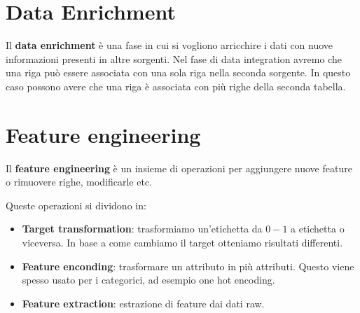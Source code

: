 \section{Data Enrichment}
Il \textbf{data enrichment} è una fase in cui si vogliono arricchire i dati con
nuove informazioni presenti in altre sorgenti. Nel fase di data integration
avremo che una riga può essere associata con una sola riga nella seconda sorgente.
In questo caso possono avere che una riga è associata con più righe della seconda
tabella.

\section{Feature engineering}
Il \textbf{feature engineering} è un insieme di operazioni per aggiungere nuove
feature o rimuovere righe, modificarle etc.

Queste operazioni si dividono in:
\begin{itemize}
      \item \textbf{Target transformation}: trasformiamo un'etichetta da $0-1$ a
            etichetta o viceversa. In base a come cambiamo il target otteniamo
            risultati differenti.
      \item \textbf{Feature enconding}: trasformare un attributo in più attributi.
            Questo viene spesso usato per i categorici, ad esempio one hot encoding.
      \item \textbf{Feature extraction}: estrazione di feature dai dati raw.
\end{itemize}